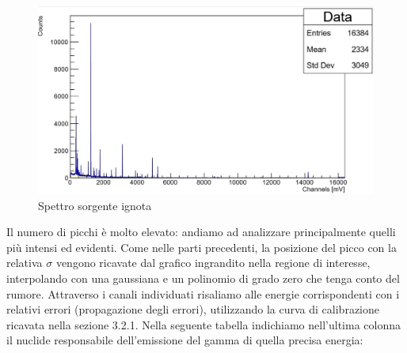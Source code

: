 \documentclass[a4paper,10pt]{article}
\begin{document}
\begin{figure}[H]
    \centering
    \includegraphics[scale=0.6]{grafici/sorgenteignota}
    \caption{Spettro sorgente ignota}
\end{figure}

\noindent Il numero di picchi \`e molto elevato: andiamo ad analizzare principalmente quelli pi\`u intensi ed evidenti. Come nelle parti precedenti, la posizione del picco con la relativa $\sigma$ vengono ricavate dal grafico ingrandito nella regione di interesse, interpolando con una gaussiana e un polinomio di grado zero che tenga conto del rumore. Attraverso i canali individuati risaliamo alle energie corrispondenti con i relativi errori (propagazione degli errori), utilizzando la curva di calibrazione ricavata nella sezione 3.2.1. Nella seguente tabella indichiamo nell'ultima colonna il nuclide responsabile dell'emissione del gamma di quella precisa energia:
\end{document}
